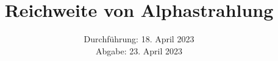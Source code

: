 

\subject{\texorpdfstring{\vspace{2ex}}{}V701\texorpdfstring{\vspace{-2ex}}{}} %
\title{Reichweite von Alphastrahlung} %
\date{
	Durchführung: 18. April 2023 %
	\\ Abgabe: 23. April 2023 %
}




\maketitle
\thispagestyle{empty}


\tableofcontents
\newpage







\printbibliography{}

\newpage



